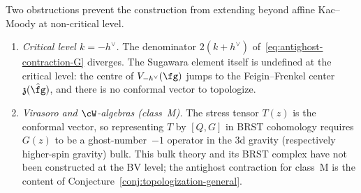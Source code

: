 \begin{remark}
\label{rem:antighost-critical}%
%
%
Two obstructions prevent the construction from extending beyond
affine Kac--Moody at non-critical level.
\begin{enumerate}[label=\textup{(\roman*)}]
\item \emph{Critical level $k = -h^\vee$.}
 The denominator $2(k + h^\vee)$ of~\eqref{eq:antighost-contraction-G}
 diverges. The Sugawara element itself is undefined at the critical
 level: the centre of $V_{-h^\vee}(\fg)$ jumps to the
 Feigin--Frenkel center $\mathfrak{z}(\hat\fg)$, and there is no
 conformal vector to topologize.
\item \emph{Virasoro and $\cW$-algebras \textup{(}class~M\textup{)}.}
 The stress tensor $T(z)$ is the conformal vector, so
 representing $T$ by $[Q, G]$ in BRST cohomology requires
 $G(z)$ to be a ghost-number~$-1$ operator
 in the $3$d gravity \textup{(}respectively higher-spin
 gravity\textup{)} bulk. This bulk theory and its BRST complex
 have not been constructed at the BV level; the antighost
 contraction for class~M is the content of
 Conjecture~\textup{\ref{conj:topologization-general}}.
\end{enumerate}
\end{remark}


